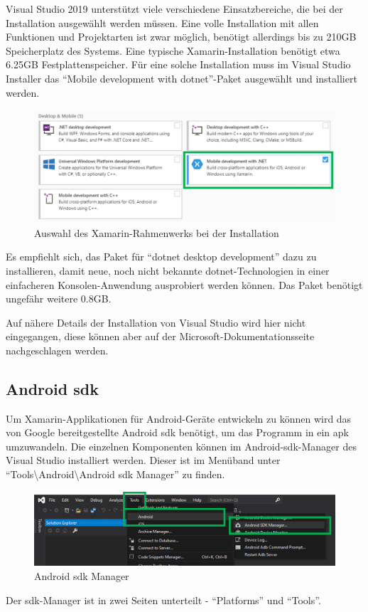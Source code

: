 Visual Studio 2019 unterstützt viele verschiedene Einsatzbereiche, die bei der Installation ausgewählt werden müssen.
Eine volle Installation mit allen Funktionen und Projektarten ist zwar möglich, benötigt allerdings bis zu 210GB Speicherplatz des Systems.
Eine typische Xamarin-Installation benötigt etwa 6.25GB Festplattenspeicher.
Für eine solche Installation muss im Visual Studio Installer das \enquote{Mobile development with \acs{dotnet}}-Paket ausgewählt und installiert werden.
\begin{figure}[H]
    \centering\includegraphics[width=0.9\linewidth]{images/auswahl_rahmenwerk/installation.png}    
    \caption{Auswahl des Xamarin-Rahmenwerks bei der Installation}
\end{figure}
Es empfiehlt sich, das Paket für \enquote{\acs{dotnet} desktop development} dazu zu installieren, damit neue, noch nicht bekannte \ac{dotnet}-Technologien in einer einfacheren Konsolen-Anwen\-dung ausprobiert werden können.
Das Paket benötigt ungefähr weitere 0.8GB.\par
Auf nähere Details der Installation von Visual Studio wird hier nicht eingegangen, diese können aber auf der Microsoft-Dokumentationsseite \cite[vgl.][]{msdoc-vs-install} nachgeschlagen werden.
%
\subsection{Android \acs{sdk}}
Um Xamarin-Applikationen für Android-Geräte entwickeln zu können wird das von Google bereitgestellte Android \ac{sdk} benötigt, um das Programm in ein \ac{apk} umzuwandeln. Die einzelnen Komponenten können im Android-\ac{sdk}-Manager des Visual Studio installiert werden.
Dieser ist im Menüband unter \enquote{Tools\textbackslash Android\textbackslash Android \ac{sdk} Manager} zu finden.
\begin{figure}[H]
    \centering\includegraphics[width=0.9\linewidth]{images/auswahl_rahmenwerk/android_sdk_installation.png}    
    \caption{Android \acs{sdk} Manager}
\end{figure}
Der \ac{sdk}-Manager ist in zwei Seiten unterteilt - \enquote{Platforms} und \enquote{Tools}.\par

